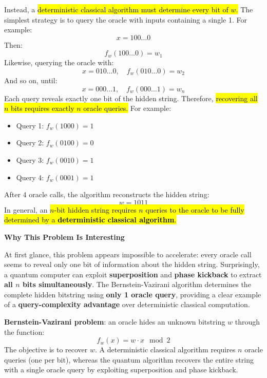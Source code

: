 \highspace
\textcolor{Red2}{} Instead, a \hl{deterministic classical algorithm must determine every bit of $w$.} The simplest strategy is to query the oracle with inputs containing a single 1. For example:
\begin{equation*}
    x = 100 \dots 0
\end{equation*}
Then:
\begin{equation*}
    f_w (100 \dots 0) = w_1
\end{equation*}
Likewise, querying the oracle with:
\begin{equation*}
    x = 010 \dots 0, \quad f_w (010 \dots 0) = w_2
\end{equation*}
And so on, until:
\begin{equation*}
    x = 000 \dots 1, \quad f_w (000 \dots 1) = w_n
\end{equation*}
Each query reveals exactly one bit of the hidden string. Therefore, \hl{recovering all $n$ bits requires exactly $n$ oracle queries.} For example:
\begin{itemize}
    \item Query 1: $f_w (1000) = 1$
    \item Query 2: $f_w (0100) = 0$
    \item Query 3: $f_w (0010) = 1$
    \item Query 4: $f_w (0001) = 1$
\end{itemize}
After 4 oracle calls, the algorithm reconstructs the hidden string:
\begin{equation*}
    w = 1011
\end{equation*}
In general, an \hl{$n$-bit hidden string requires $n$ queries to the oracle to be fully determined by a \textbf{deterministic classical algorithm}.}

\highspace
\begin{flushleft}
    \textcolor{Green3}{ \textbf{Why This Problem Is Interesting}}
\end{flushleft}
At first glance, this problem appears impossible to accelerate: every oracle call seems to reveal only one bit of information about the hidden string. Surprisingly, a quantum computer can exploit \textbf{superposition} and \textbf{phase kickback} to extract \textbf{all $n$ bits simultaneously}. The Bernstein-Vazirani algorithm determines the complete hidden bitstring using \textbf{only 1 oracle query}, providing a clear example of a \textbf{query-complexity advantage} over deterministic classical computation.

\highspace
\begin{takeawaysbox}
    \textbf{Bernstein-Vazirani problem}: an oracle hides an unknown bitstring $w$ through the function:
    \begin{equation*}
        f_w (x) = w \cdot x \mod 2
    \end{equation*}
    The objective is to recover $w$. A deterministic classical algorithm requires $n$ oracle queries (one per bit), whereas the quantum algorithm recovers the entire string with a single oracle query by exploiting superposition and phase kickback.
\end{takeawaysbox}